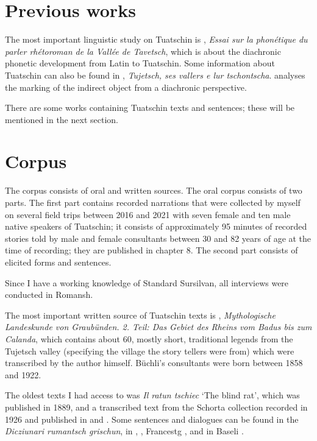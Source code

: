 \section{Previous works}
The most important linguistic study on Tuatschin is  \citet{Caduff1952}, \textit{Essai sur la phonétique du parler rhétoroman de la Vallée de Tavetsch}, which is about the diachronic phonetic development from Latin to Tuatschin. Some information about Tuatschin can also be found in \citet{VicHendry2010}, \textit{Tujetsch, ses vallers e lur tschontscha}. \citet{Maurer2017} analyses the marking of the indirect object from a diachronic perspective. 

There are some works containing Tuatschin texts and sentences; these will be mentioned in the next section.

\section{Corpus}
The corpus consists of oral and written sources. The oral corpus consists of two parts. The first part contains recorded narrations that were collected by myself on several field trips between 2016 and 2021 with seven female and ten male native speakers of Tuatschin; it consists of approximately 95 minutes of recorded stories told by male and female consultants between 30 and 82 years of age at the time of recording; they are published in chapter 8. The second part consists of elicited forms and sentences.

Since I have a working knowledge of Standard Sursilvan, all interviews were conducted in Romansh.

The most important written source of Tuatschin texts is \citet{Büchli1966}, \textit{Mythologische Landeskunde von Graubünden. 2. Teil: Das Gebiet des Rheins vom Badus bis zum Calanda}, which contains about 60, mostly short, traditional legends from the Tujetsch valley (specifying the village the story tellers were from) which were transcribed by the author himself. Büchli's consultants were born between 1858 and 1922.

The oldest texts I had access to was \textit{Il ratun tschiec} `The blind rat', which was published in 1889, and a transcribed text from the Schorta collection recorded in 1926 and published in \citet{Valär2013a} and \citet{Valär2013b}. Some sentences and dialogues can be found in the \textit{Dicziunari rumantsch grischun}, in \citet{Gartner1910}, \citet{Gadola1935}, Francestg \citet{Berther1998}, and in Baseli \citet{Berther2007}. 

